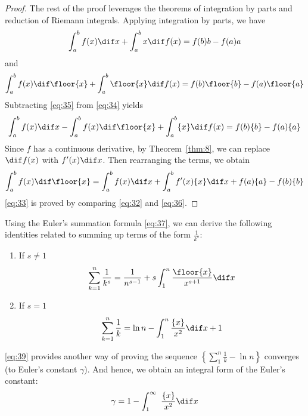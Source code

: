 \documentclass[thmcnt=section, color=blue, 12pt]{my-elegantbook}
\begin{document}
\begin{proof}
	The rest of the proof leverages the theorems of
	integration by parts and reduction of Riemann integrals.
	Applying integration by parts, we have
	\begin{align}
		\int_a^b f(x) \dif x + \int_a^b x \dif f(x)
		= f(b)b - f(a)a
		\label{eq:34}
	\end{align}
	and
	\begin{align}
		\int_a^b f(x) \dif \floor{x} + \int_a^b \floor{x} \dif f(x)
		= f(b) \floor{b} - f(a) \floor{a}
		\label{eq:35}
	\end{align}
	Subtracting \eqref{eq:35} from \eqref{eq:34} yields
	\begin{align*}
		\int_a^b f(x) \dif x - \int_a^b f(x) \dif \floor{x}
		+ \int_a^b \{x\} \dif f(x)
		= f(b) \{b\} - f(a) \{a\}
	\end{align*}
	Since $f$ has a continuous derivative,
	by Theorem~\ref{thm:8},
	we can replace $\dif f(x)$
	with $f^\prime(x) \dif x$.
	Then rearranging the terms, we obtain
	\begin{align}
		\int_a^b f(x) \dif \floor{x}
		= \int_a^b f(x)\dif x
		+ \int_a^b f^\prime(x) \{x\} \dif x
		+ f(a) \{a\} - f(b) \{b\}
		\label{eq:36}
	\end{align}
	\eqref{eq:33} is proved by comparing \eqref{eq:32} and \eqref{eq:36}.
\end{proof}

\begin{example}
	Using the Euler's summation formula \eqref{eq:37},
	we can derive the following
	identities related to summing up terms of the form $\frac{1}{k^s}$:
	\begin{enumerate}
		\item If $s \neq 1$
		      \begin{align*}
			      \sum_{k=1}^n \frac{1}{k^s} = \frac{1}{n^{s-1}} + s \int_1^n \frac{\floor{x}}{x^{s+1}} \dif x
		      \end{align*}
		\item If $s=1$
		      \begin{align}
			      \sum_{k=1}^n \frac{1}{k}
			      = \ln n - \int_1^n \frac{\{x\}}{x^{2}} \dif x + 1
			      \label{eq:39}
		      \end{align}
	\end{enumerate}

	\eqref{eq:39} provides another way of
	proving
	the sequence $\left\{ \sum_{1}^n \frac{1}{k} - \ln n\right\}$ converges
	(to Euler's constant $\gamma$).
	And hence, we obtain an integral form of the Euler's constant:
	\begin{align*}
		\gamma = 1 - \int_1^\infty\ \frac{\{x\}}{x^2} \dif x
	\end{align*}
\end{example}
\end{document}
